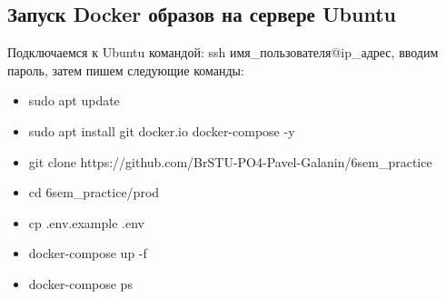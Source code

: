 \newpage
\subsection{Запуск Docker образов на сервере Ubuntu}

Подключаемся к Ubuntu командой: ssh имя\_пользователя@ip\_адрес, вводим пароль,
затем пишем следующие команды:

\begin{itemize}
  \item sudo apt update
  \item sudo apt install git docker.io docker-compose -y
  \item git clone https://github.com/BrSTU-PO4-Pavel-Galanin/6sem\_practice
  \item cd 6sem\_practice/prod
  \item cp .env.example .env
  \item docker-compose up -f
  \item docker-compose ps
\end{itemize}








